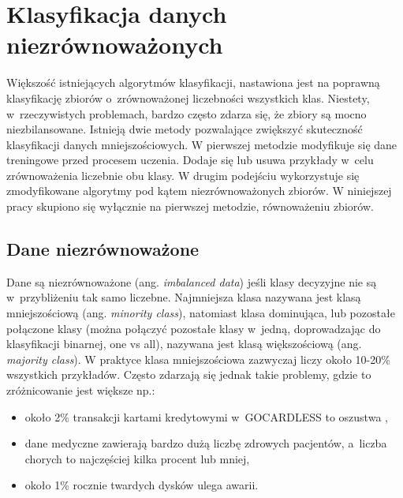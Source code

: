 \chapter{Klasyfikacja danych niezrównoważonych}
Większość istniejących algorytmów klasyfikacji, nastawiona jest na poprawną klasyfikację zbiorów o~zrównoważonej liczebności wszystkich klas. Niestety, w~rzeczywistych problemach, bardzo często zdarza się, że zbiory są mocno niezbilansowane. Istnieją dwie metody pozwalające zwiększyć skuteczność klasyfikacji danych mniejszościowych. W pierwszej metodzie modyfikuje się dane treningowe przed procesem uczenia. Dodaje się lub usuwa przykłady w~celu zrównoważenia liczebnie obu klasy. W drugim podejściu wykorzystuje się zmodyfikowane algorytmy pod kątem niezrównoważonych zbiorów. W niniejszej pracy skupiono się wyłącznie na pierwszej metodzie, równoważeniu zbiorów.	
\section{Dane niezrównoważone}
Dane są niezrównoważone (ang. \textit{imbalanced data}) jeśli klasy decyzyjne nie są w~przybliżeniu tak samo liczebne. Najmniejsza klasa nazywana jest klasą mniejszościową (ang. \textit{minority class}), natomiast klasa dominująca, lub pozostałe połączone klasy (można połączyć pozostałe klasy w~jedną, doprowadzając do klasyfikacji binarnej, one vs all), nazywana jest klasą większościową (ang. \textit{majority class}). W praktyce klasa mniejszościowa zazwyczaj liczy około 10-20\% wszystkich przykładów. Często zdarzają się jednak takie problemy, gdzie to zróżnicowanie jest większe np.:
\begin{itemize}
	\item około 2\% transakcji kartami kredytowymi w~GOCARDLESS to oszustwa \cite{gocardless},
	\item dane medyczne zawierają bardzo dużą liczbę zdrowych pacjentów, a~liczba chorych to najczęściej kilka procent lub mniej,
	\item około 1\% rocznie twardych dysków ulega awarii.
	
\end{itemize}

